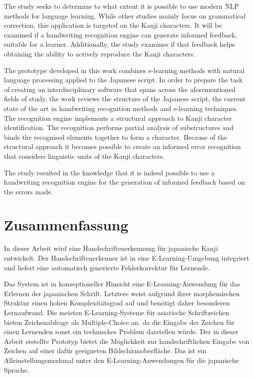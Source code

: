 The study seeks to determine to what extent it is possible to use modern NLP 
methods for language learning. While other studies mainly focus on grammatical
correction, this application is targeted on the Kanji characters. It will be 
examined if a handwriting recognition engine can generate informed feedback,
suitable for a learner. Additionally, the study examines if that feedback helps 
obtaining the ability to actively reproduce the Kanji characters.

The prototype developed in this work combines e-learning methods with natural
language processing applied to the Japanese script. In order to prepare the 
task of creating an interdisciplinary software that spans across the aforementioned 
fields of study, the work reviews the structure of the Japanese script, 
the current state of the art in handwriting recognition methods and e-learning 
techniques.
The recognition engine implements a structural approach to Kanji character 
identification. The recognition performs partial analysis of substructures
and binds the recognised elements together to form a character.
Because of the structural approach it becomes possible to create an informed
error recognition that considers linguistic units of the Kanji characters.

The study resulted in the knowledge that it is indeed possible to use a handwriting
recognition engine for the generation of informed feedback based on the errors made.

\chapter*{Zusammenfassung}
\label{chap:zusammenfassung}

In dieser Arbeit wird eine Handschriftenerkennung für japanische Kanji 
entwickelt. Der Handschriftenerkenner ist in eine E-Learning-Umgebung integriert 
und liefert eine automatisch generierte Fehlerkorrektur für Lernende.

Das System ist in konzeptioneller Hinsicht eine E-Learning-Anwendung für das 
Erlernen der japanischen Schrift. Letztere weist aufgrund ihrer morphemischen 
Struktur einen hohen Komplexitätsgrad auf und benötigt daher besonderen 
Lernaufwand. Die meisten E-Learning-Systeme für asiatische Schriftzeichen bieten 
Zeichenabfrage als Multiple-Choice an, da die Eingabe der Zeichen für einen 
Lernenden sonst ein technisches Problem darstellen würde.
Der in dieser Arbeit erstellte Prototyp bietet die Möglichkeit 
zur handschriftlichen Eingabe von Zeichen auf einer dafür geeigneten 
Bildschirmoberfläche. Das ist ein Alleinstellungsmerkmal unter den 
E-Learning-Anwendungen für die japanische Sprache.


